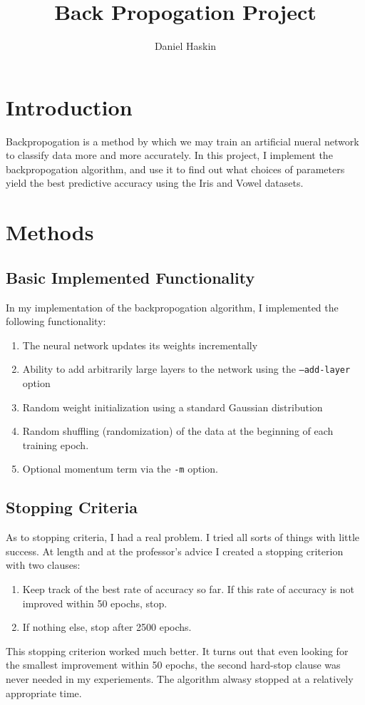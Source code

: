 \documentclass[12pt]{article}
\title{Back Propogation Project}
\author{Daniel Haskin}
\begin{document}
\maketitle
\section{Introduction}
Backpropogation is a method by which we may train an artificial nueral network
to classify data more and more accurately. In this project, I implement the
backpropogation algorithm, and use it to find out what choices of parameters
yield the best predictive accuracy using the Iris and Vowel datasets.
\section{Methods}
\subsection{Basic Implemented Functionality}
In my implementation of the backpropogation algorithm, I implemented
the following functionality:
\begin{enumerate}
\item The neural network updates its weights incrementally
\item Ability to add arbitrarily large layers to the network using the
    \texttt{--add-layer} option
\item Random weight initialization using a standard Gaussian distribution
\item Random shuffling (randomization) of the data at the beginning of each
    training epoch.
\item Optional momentum term via the \texttt{-m} option.
\end{enumerate}
\subsection{Stopping Criteria}
 As to stopping criteria, I had a real problem. I tried all sorts of things
 with little success. At length and at the professor's advice I created
 a stopping criterion with two clauses:
 \begin{enumerate}
     \item Keep track of the best rate of accuracy so far. If this rate of
         accuracy is not improved within 50 epochs, stop.
     \item If nothing else, stop after 2500 epochs.
 \end{enumerate}
 This stopping criterion worked much better. It turns out that even looking
 for the smallest improvement within 50 epochs, the second hard-stop clause
 was never needed in my experiements. The algorithm alwasy stopped at a
 relatively appropriate time.
\end{document}
